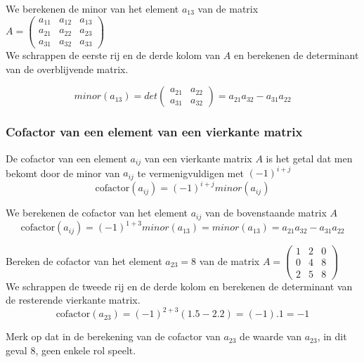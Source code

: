 \begin{voorbeeld}
	

We berekenen de minor van het element $a_{13}$ van de matrix $A=\left( \begin{matrix} a_{11} & a_{12} & a_{13} \\ a_{21} & a_{22} & a_{23} \\ a_{31} & a_{32} & a_{33} \end{matrix} \right)$\\

We schrappen de eerste rij en de derde kolom van $A$ en berekenen de determinant van de overblijvende matrix.

\[ minor(a_{13})=det \left( \begin{matrix} a_{21} & a_{22} \\ a_{31} & a_{32} \end{matrix} \right) = a_{21}a_{32}-a_{31}a_{22} \]
\end{voorbeeld}

\subsubsection{Cofactor van een element van een vierkante matrix}

De cofactor van een element $a_{ij}$ van een vierkante matrix $A$ is het getal dat men bekomt door de minor van $a_{ij}$ te vermenigvuldigen met $(-1)^{i+j}$\\

\[ \text{cofactor}(a_{ij})=(-1)^{i+j} minor(a_{ij}) \]

\begin{voorbeeld}
	
We berekenen de cofactor van het element $a_{ij}$ van de bovenstaande matrix $A$\\

\[ \text{cofactor}(a_{ij})=(-1)^{1+3} minor(a_{13})=minor(a_{13})=a_{21}a_{32}-a_{31}a_{22} \] 

\end{voorbeeld}

\begin{voorbeeld}
	Bereken de cofactor van het element $a_{23}=8$ van de matrix $A=\left( \begin{matrix} 1 & 2 & 0 \\ 0 & 4 & 8 \\ 2 & 5 & 8 \end{matrix} \right)$\\

We schrappen de tweede rij en de derde kolom en berekenen de determinant van de resterende vierkante matrix.\\

\[ \text{cofactor}(a_{23})=(-1)^{2+3} (1.5-2.2) = (-1).1 =-1 \]

Merk op dat in de berekening van de cofactor van $a_{23}$ de waarde van $a_{23}$, in dit geval $8$, geen enkele rol speelt.

\end{voorbeeld}

